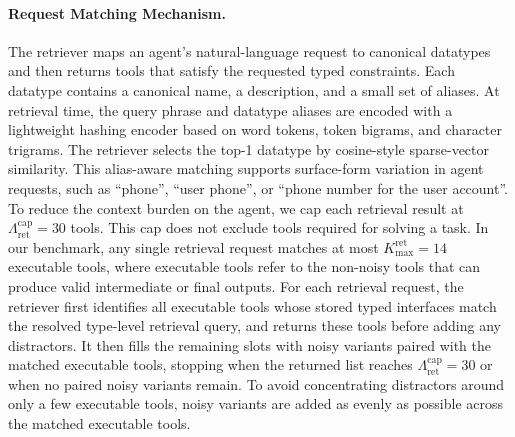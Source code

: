 
\paragraph{Request Matching Mechanism.} The retriever maps an agent's natural-language request to canonical datatypes and then returns tools that satisfy the requested typed constraints. 
Each datatype contains a canonical name, a description, and a small set of aliases. 
At retrieval time, the query phrase and datatype aliases are encoded with a lightweight hashing encoder based on word tokens, token bigrams, and character trigrams. 
The retriever selects the top-1 datatype by cosine-style sparse-vector similarity. 
This alias-aware matching supports surface-form variation in agent requests, such as ``phone'', ``user phone'', or ``phone number for the user account''.
To reduce the context burden on the agent, we cap each retrieval result at $\Lambda_{\mathrm{ret}}^{\mathrm{cap}}=30$ tools. This cap does not exclude tools required for solving a task. In our benchmark, any single retrieval request matches at most $K_{\max}^{\mathrm{ret}}=14$ executable tools, where executable tools refer to the non-noisy tools that can produce valid intermediate or final outputs.
For each retrieval request, the retriever first identifies all executable tools whose stored typed interfaces match the resolved type-level retrieval query, and returns these tools before adding any distractors. It then fills the remaining slots with noisy variants paired with the matched executable tools, stopping when the returned list reaches $\Lambda_{\mathrm{ret}}^{\mathrm{cap}}=30$ or when no paired noisy variants remain. To avoid concentrating distractors around only a few executable tools, noisy variants are added as evenly as possible across the matched executable tools.



